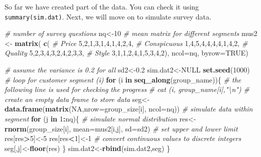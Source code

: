 \documentclass[12pt,]{krantz}
\makeatletter
\newenvironment{Shaded}{\begin{snugshade}}{\end{snugshade}}
\newcommand{\KeywordTok}[1]{\textcolor[rgb]{0.27,0.27,0.27}{\textbf{#1}}}
\newcommand{\DataTypeTok}[1]{\textcolor[rgb]{0.27,0.27,0.27}{#1}}
\newcommand{\DecValTok}[1]{\textcolor[rgb]{0.06,0.06,0.06}{#1}}
\newcommand{\FloatTok}[1]{\textcolor[rgb]{0.06,0.06,0.06}{#1}}
\newcommand{\StringTok}[1]{\textcolor[rgb]{0.5,0.5,0.5}{#1}}
\newcommand{\CommentTok}[1]{\textcolor[rgb]{0.37,0.37,0.37}{\textit{#1}}}
\newcommand{\OtherTok}[1]{\textcolor[rgb]{0.37,0.37,0.37}{#1}}
\newcommand{\ControlFlowTok}[1]{\textcolor[rgb]{0.27,0.27,0.27}{\textbf{#1}}}
\newcommand{\OperatorTok}[1]{\textcolor[rgb]{0.43,0.43,0.43}{\textbf{#1}}}
\newcommand{\NormalTok}[1]{#1}
\newenvironment{kframe}{%
\medskip{}
\setlength{\fboxsep}{.8em}
 \def\at@end@of@kframe{}%
 \ifinner\ifhmode%
  \def\at@end@of@kframe{\end{minipage}}%
  \begin{minipage}{\columnwidth}%
 \fi\fi%
 \def\FrameCommand##1{\hskip\@totalleftmargin \hskip-\fboxsep
 \colorbox{shadecolor}{##1}\hskip-\fboxsep
     \hskip-\linewidth \hskip-\@totalleftmargin \hskip\columnwidth}%
 \MakeFramed {\advance\hsize-\width
   \@totalleftmargin\z@ \linewidth\hsize
   \@setminipage}}%
 {\par\unskip\endMakeFramed%
 \at@end@of@kframe}
\renewenvironment{Shaded}{\begin{kframe}}{\end{kframe}}
\theoremstyle{definition}
\theoremstyle{definition}
\theoremstyle{definition}
\theoremstyle{remark}
\makeatother
\begin{document}
So far we have created part of the data. You can check it using
\texttt{summary(sim.dat)}. Next, we will move on to simulate survey
data.

\begin{Shaded}
\begin{Highlighting}[]
\CommentTok{# number of survey questions}
\NormalTok{nq<-}\DecValTok{10}
\CommentTok{# mean matrix for different segments }
\NormalTok{mus2 <-}\StringTok{ }\KeywordTok{matrix}\NormalTok{( }\KeywordTok{c}\NormalTok{(}
  \CommentTok{# Price}
 \DecValTok{5}\NormalTok{,}\DecValTok{2}\NormalTok{,}\DecValTok{1}\NormalTok{,}\DecValTok{3}\NormalTok{,}\DecValTok{1}\NormalTok{,}\DecValTok{4}\NormalTok{,}\DecValTok{1}\NormalTok{,}\DecValTok{4}\NormalTok{,}\DecValTok{2}\NormalTok{,}\DecValTok{4}\NormalTok{,}
  \CommentTok{# Conspicuous}
 \DecValTok{1}\NormalTok{,}\DecValTok{4}\NormalTok{,}\DecValTok{5}\NormalTok{,}\DecValTok{4}\NormalTok{,}\DecValTok{4}\NormalTok{,}\DecValTok{4}\NormalTok{,}\DecValTok{4}\NormalTok{,}\DecValTok{1}\NormalTok{,}\DecValTok{4}\NormalTok{,}\DecValTok{2}\NormalTok{,}
  \CommentTok{# Quality}
 \DecValTok{5}\NormalTok{,}\DecValTok{2}\NormalTok{,}\DecValTok{3}\NormalTok{,}\DecValTok{4}\NormalTok{,}\DecValTok{3}\NormalTok{,}\DecValTok{2}\NormalTok{,}\DecValTok{4}\NormalTok{,}\DecValTok{2}\NormalTok{,}\DecValTok{3}\NormalTok{,}\DecValTok{3}\NormalTok{,}
  \CommentTok{# Style}
 \DecValTok{3}\NormalTok{,}\DecValTok{1}\NormalTok{,}\DecValTok{1}\NormalTok{,}\DecValTok{2}\NormalTok{,}\DecValTok{4}\NormalTok{,}\DecValTok{1}\NormalTok{,}\DecValTok{5}\NormalTok{,}\DecValTok{3}\NormalTok{,}\DecValTok{4}\NormalTok{,}\DecValTok{2}\NormalTok{), }\DataTypeTok{ncol=}\NormalTok{nq, }\DataTypeTok{byrow=}\OtherTok{TRUE}\NormalTok{)}

\CommentTok{# assume the variance is 0.2 for all}
\NormalTok{sd2<-}\FloatTok{0.2}
\NormalTok{sim.dat2<-}\OtherTok{NULL}
\KeywordTok{set.seed}\NormalTok{(}\DecValTok{1000}\NormalTok{)}
\CommentTok{# loop for customer segment (i)}
\ControlFlowTok{for}\NormalTok{ (i }\ControlFlowTok{in} \KeywordTok{seq_along}\NormalTok{(group_name))\{}
  \CommentTok{# the following line is used for checking the progress}
  \CommentTok{# cat (i, group_name[i],"\textbackslash{}n")}
  \CommentTok{# create an empty data frame to store data}
\NormalTok{  seg<-}\KeywordTok{data.frame}\NormalTok{(}\KeywordTok{matrix}\NormalTok{(}\OtherTok{NA}\NormalTok{,}\DataTypeTok{nrow=}\NormalTok{group_size[i], }\DataTypeTok{ncol=}\NormalTok{nq))  }
  \CommentTok{# simulate data within segment}
  \ControlFlowTok{for}\NormalTok{ (j }\ControlFlowTok{in} \DecValTok{1}\OperatorTok{:}\NormalTok{nq)\{}
    \CommentTok{# simulate normal distribution}
\NormalTok{    res<-}\KeywordTok{rnorm}\NormalTok{(group_size[i], }\DataTypeTok{mean=}\NormalTok{mus2[i,j], }\DataTypeTok{sd=}\NormalTok{sd2)}
    \CommentTok{# set upper and lower limit}
\NormalTok{    res[res}\OperatorTok{>}\DecValTok{5}\NormalTok{]<-}\DecValTok{5}
\NormalTok{    res[res}\OperatorTok{<}\DecValTok{1}\NormalTok{]<-}\DecValTok{1}
    \CommentTok{# convert continuous values to discrete integers}
\NormalTok{    seg[,j]<-}\KeywordTok{floor}\NormalTok{(res)}
\NormalTok{  \}}
\NormalTok{  sim.dat2<-}\KeywordTok{rbind}\NormalTok{(sim.dat2,seg)}
\NormalTok{\}}


\end{Highlighting}
\end{Shaded}
\end{document}
